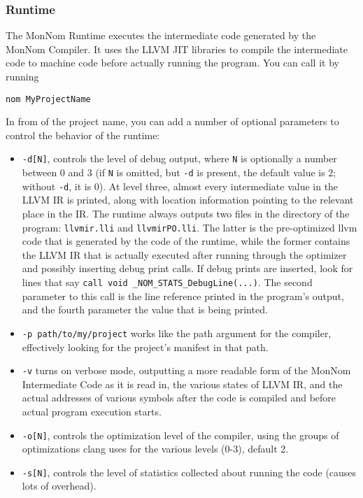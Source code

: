 \documentclass{article}
\begin{document}
\subsubsection{Runtime}
\label{sec:runtime}
The MonNom Runtime executes the intermediate code generated by the MonNom Compiler.
It uses the LLVM JIT libraries to compile the intermediate code to machine code before actually running the program.
You can call it by running

\begin{verbatim}
nom MyProjectName
\end{verbatim}

In from of the project name, you can add a number of optional parameters to control the behavior of the runtime:
\begin{itemize}
\item \texttt{-d[N]}, controls the level of debug output, where \texttt{N} is optionally a number between 0 and 3 (if \texttt{N} is omitted, but \texttt{-d} is present, the default value is 2; without \texttt{-d}, it is 0).
At level three, almost every intermediate value in the LLVM IR is printed, along with location information pointing to the relevant place in the IR.
The runtime always outputs two files in the directory of the program: \texttt{llvmir.lli} and \texttt{llvmirPO.lli}.
The latter is the pre-optimized llvm code that is generated by the code of the runtime, while the former contains the LLVM IR that is actually executed after running through the optimizer and possibly inserting debug print calls.
If debug prints are inserted, look for lines that say \texttt{call void \@RT\_NOM\_STATS\_DebugLine(...)}.
The second parameter to this call is the line reference printed in the program's output, and the fourth parameter the value that is being printed.
\item \texttt{-p path/to/my/project} works like the path argument for the compiler, effectively looking for the project's manifest in that path.
\item \texttt{-v} turns on verbose mode, outputting a more readable form of the MonNom Intermediate Code as it is read in, the various states of LLVM IR, and the actual addresses of various symbols after the code is compiled and before actual program execution starts.
\item \texttt{-o[N]}, controls the optimization level of the compiler, using the groups of optimizations clang uses for the various levels (0-3), default 2.
\item \texttt{-s[N]}, controls the level of statistics collected about running the code (causes lots of overhead).

\end{itemize}
\end{document}

